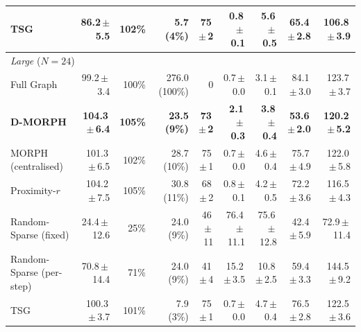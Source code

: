 \begin{table}[!ht]
\begin{tabular}{lrrrrrrrr}
TSG & 86.2\,$\pm$\,5.5 & 102\% & 5.7 (4\%) & 75\,$\pm$\,2 & 0.8\,$\pm$\,0.1 & 5.6\,$\pm$\,0.5 & 65.4\,$\pm$\,2.8 & 106.8\,$\pm$\,3.9 \\
\hline
\multicolumn{9}{l}{\textit{Large} ($N=24$)} \\
Full Graph & 99.2\,$\pm$\,3.4 & 100\% & 276.0 (100\%) & 0 & 0.7\,$\pm$\,0.0 & 3.1\,$\pm$\,0.1 & 84.1\,$\pm$\,3.0 & 123.7\,$\pm$\,3.7 \\
\textbf{D-MORPH} & \textbf{104.3\,$\pm$\,6.4} & \textbf{105\%} & \textbf{23.5 (9\%)} & \textbf{73\,$\pm$\,2} & \textbf{2.1\,$\pm$\,0.3} & \textbf{3.8\,$\pm$\,0.4} & \textbf{53.6\,$\pm$\,2.0} & \textbf{120.2\,$\pm$\,5.2} \\
MORPH (centralised) & 101.3\,$\pm$\,6.5 & 102\% & 28.7 (10\%) & 75\,$\pm$\,1 & 0.7\,$\pm$\,0.0 & 4.6\,$\pm$\,0.4 & 75.7\,$\pm$\,4.9 & 122.0\,$\pm$\,5.8 \\
Proximity-$r$ & 104.2\,$\pm$\,7.5 & 105\% & 30.8 (11\%) & 68\,$\pm$\,2 & 0.8\,$\pm$\,0.1 & 4.2\,$\pm$\,0.5 & 72.2\,$\pm$\,3.6 & 116.5\,$\pm$\,4.3 \\
Random-Sparse (fixed) & 24.4\,$\pm$\,12.6 & 25\% & 24.0 (9\%) & 46\,$\pm$\,11 & 76.4\,$\pm$\,11.1 & 75.6\,$\pm$\,12.8 & 42.4\,$\pm$\,5.9 & 72.9\,$\pm$\,11.4 \\
Random-Sparse (per-step) & 70.8\,$\pm$\,14.4 & 71\% & 24.0 (9\%) & 41\,$\pm$\,4 & 15.2\,$\pm$\,3.5 & 10.8\,$\pm$\,2.5 & 59.4\,$\pm$\,3.3 & 144.5\,$\pm$\,9.2 \\
TSG & 100.3\,$\pm$\,3.7 & 101\% & 7.9 (3\%) & 75\,$\pm$\,1 & 0.7\,$\pm$\,0.0 & 4.7\,$\pm$\,0.4 & 76.5\,$\pm$\,2.8 & 122.5\,$\pm$\,3.6 \\
\hline
\end{tabular}
\end{table}

